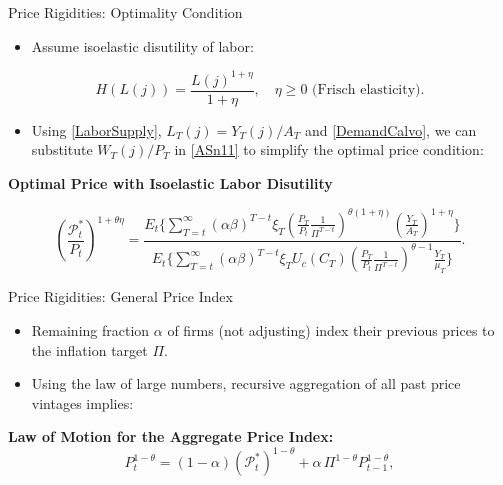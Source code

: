 \documentclass[11pt,aspectratio=169]{beamer}
\begin{document}
\begin{frame}[label=CalvoIsoelastic]{Price Rigidities: Optimality Condition}
\small

\begin{itemize}
  \item Assume isoelastic disutility of labor:
\end{itemize}

\begin{equation*}
H(L(j)) = \frac{L(j)^{1+\eta}}{1+\eta}, \quad \eta \ge 0 \text{ (Frisch elasticity).}
\end{equation*}

\begin{itemize}
  \item Using \eqref{LaborSupply}, $L_T(j)=Y_T(j)/A_T$ and \eqref{DemandCalvo}, we can substitute $W_T(j)/P_T$ in \eqref{ASn11} to simplify the optimal price condition:
\end{itemize}
\vspace{0.5em}
\textbf{Optimal Price with Isoelastic Labor Disutility}

\begin{equation}
\left( \frac{\mathcal{P}_t^\ast}{P_t} \right)^{1+\theta \eta} = 
\frac{
E_t \Big\{ \sum_{T=t}^{\infty} (\alpha \beta)^{T-t} \xi_T 
\left( \frac{P_T}{P_t} \frac{1}{\Pi^{T-t}} \right)^{\theta(1+\eta)} 
\left( \frac{Y_T}{A_T} \right)^{1+\eta} \Big\}
}{
E_t \Big\{ \sum_{T=t}^{\infty} (\alpha \beta)^{T-t} \xi_T U_c(C_T) 
\left( \frac{P_T}{P_t} \frac{1}{\Pi^{T-t}} \right)^{\theta-1} 
\frac{Y_T}{\mu_T} \Big\}
}.
\label{ASn33}
\end{equation}

\end{frame}

\begin{frame}[label=CalvoPriceIndex]{Price Rigidities: General Price Index}
\small

\begin{itemize}
    \item   Remaining fraction $\alpha$ of firms (not adjusting) index their previous prices to the inflation target $\Pi$.
    \vspace{0.5em}
  \item Using the law of large numbers, recursive aggregation of all past price vintages implies:
\end{itemize}

\textbf{Law of Motion for the Aggregate Price Index:}
\begin{equation}
P_t^{1-\theta} = (1-\alpha) (\mathcal{P}_t^\ast)^{1-\theta} + 
\alpha \, \Pi^{1-\theta} P_{t-1}^{1-\theta},
\label{ASn22}
\end{equation}

\vspace{0.3cm}
\begin{center}
\hyperlink{Appendix E}{}
\end{center}

\end{frame}
\end{document}
